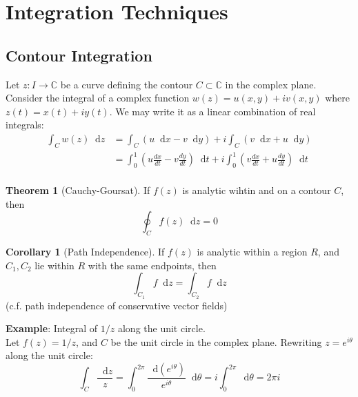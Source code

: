 \documentclass{article}
\newcommand{\diff}{\mathop{}\!\mathrm{d}}
\newcommand{\C}{\mathbb{C}}
\theoremstyle{definition}
\newtheorem{thm}{Theorem}[section]
\newtheorem{corl}{Corollary}[section]
\begin{document}

\section{Integration Techniques}

\subsection{Contour Integration}
Let $z : I \to \C$ be a curve defining the contour $C \subset \C$ in the complex plane.
Consider the integral of a complex function $w(z) = u(x,y) + iv(x,y)$ where
$z(t) = x(t) + iy(t)$. We may write it as a linear combination of real integrals:
\begin{equation*}
\begin{split}
	\int_C w(z) \diff z
		&= \int_C (u \diff x - v \diff y) + i \int_C (v \diff x + u \diff y) \\
		&= \int_0^1 \left(u \frac{dx}{dt} - v \frac{dy}{dt}\right) \diff t + i \int_0^1 \left(v \frac{dx}{dt} + u \frac{dy}{dt}\right) \diff t \\
\end{split}
\end{equation*}

\begin{thm}[Cauchy-Goursat]
	If $f(z)$ is analytic wihtin and on a contour $C$, then
	\begin{equation*}
		\oint_C f(z) \diff z = 0
	\end{equation*}
\end{thm}
\begin{corl}[Path Independence]
	If $f(z)$ is analytic within a region $R$, and $C_1,C_2$ lie within $R$ with the same
	endpoints, then
	\begin{equation*}
		\int_{C_1} f \diff z = \int_{C_2} f \diff z
	\end{equation*}
	(c.f. path independence of conservative vector fields) 
\end{corl}

\textbf{Example}: Integral of $1/z$ along the unit circle. \\
Let $f(z) = 1/z$, and $C$ be the unit circle in the complex plane. Rewriting
$z = e^{i\theta}$ along the unit circle:
\begin{equation*}
	\int_C \frac{\diff z}{z} = \int_0^{2\pi} \frac{\diff \left(e^{i\theta}\right)}{e^{i\theta}} \diff \theta = i \int_0^{2\pi} \diff \theta = 2\pi i
\end{equation*}
\end{document}
